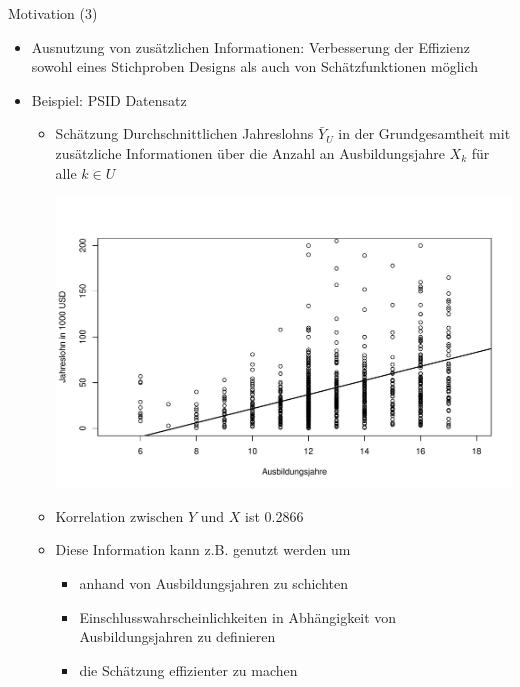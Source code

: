 \documentclass[9pt]{beamer}
\begin{document}
\begin{frame}{Motivation (3)}
\begin{itemize}
	\item Ausnutzung von zusätzlichen Informationen: Verbesserung der Effizienz sowohl eines Stichproben Designs als auch von Schätzfunktionen möglich
	\item Beispiel: PSID Datensatz
	\begin{itemize}
		\item Schätzung Durchschnittlichen Jahreslohns $\bar{Y}_U$ in der Grundgesamtheit mit zusätzliche Informationen über die Anzahl an Ausbildungsjahre $X_k$ für alle $k\in U$
	\begin{center}
		\includegraphics[height=0.4\textheight]{pics/psidwage}
	\end{center}
	\item Korrelation zwischen $Y$ und $X$ ist 0.2866
	\item Diese Information kann z.B. genutzt werden um 
	\begin{itemize}
		\item anhand von Ausbildungsjahren zu schichten
		\item Einschlusswahrscheinlichkeiten in Abhängigkeit von Ausbildungsjahren zu definieren
		\item die Schätzung effizienter zu machen
	\end{itemize}
\end{itemize}
\end{itemize}
\end{frame}
\end{document}
